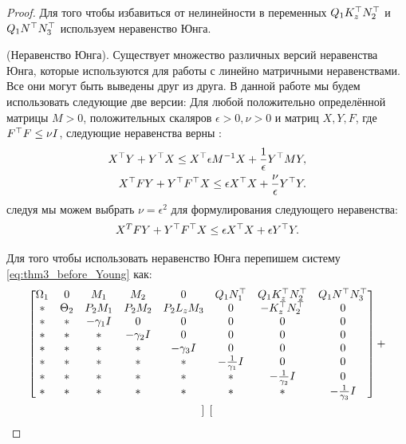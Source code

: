 \begin{proof}
Для того чтобы избавиться от нелинейности в переменных ${Q}_1{K}_z^\top{N}_2^\top$  и ${Q}_1 {N}^\top{N}_3^\top $ используем неравенство Юнга.

	\begin{lemma}\label{lemma:Young}
		(Неравенство Юнга).
		Существует множество различных версий неравенства Юнга, которые используются для работы с линейно матричными неравенствами. Все они могут быть выведены друг из друга. В данной работе мы будем использовать следующие две версии:
		Для любой положительно определённой матрицы $M>0$, положительных скаляров $\epsilon > 0, \nu > 0$ и матриц ${X}, {Y}, {F}$, где ${F}^\top{F}\leq \nu{I}$, следующие неравенства верны \cite{BOYED1994}:
		\begin{align}
			\label{eq:Young_relation_BMI}
			{X}^\top{Y} + {Y}^\top{X}  \leq {X}^\top 
			\epsilon {M}^{-1}{X} + \frac{1}{\epsilon}   {Y}^\top  {M}{Y}, 
			\\
			\label{eq:Young_robust_2}
			{X}^\top{F}{Y} + {Y}^\top{F}^\top{X}  \leq \epsilon {X}^\top{X} +  \frac{\nu}{\epsilon} {Y}^\top {Y}.
		\end{align}
		следуя \cite{LIEN2008} мы можем выбрать $\nu=\epsilon^2$ для формулирования следующего неравенства:
		\begin{equation}
			\label{eq:updated_Young_robust_2}
			{X}^T{F}{Y} + {Y}^\top{F}^\top{X}  \leq \epsilon {X}^\top{X} + \epsilon {Y}^\top{Y}.
		\end{equation}
	\end{lemma}
	Для того чтобы использовать неравенство Юнга перепишем систему \ref{eq:thm3_before_Young} как:
	\begin{multline}
	\label{eq:thm3_before_Young_2}
	\begin{bmatrix}
		{\Omega}_1 & 0 & {M}_1 & {M}_2 & 0& {Q}_1{N}_1^\top & {Q}_1{K}_z^\top{N}_2^\top & {Q}_1 {N}^\top{N}_3^\top 
		\\
		* & {\Theta}_2 & {P}_2{M}_1 & {P}_2{M}_2 & {P}_2{L}_z{M}_3 & 0 & -{K}_z^\top{N}_2^\top & 0\\
		* & * & -\gamma_1{I} & 0&0&0&0&0\\
		* & * & * & -\gamma_2{I}&0&0&0&0\\
		* & * & * & *&-\gamma_3{I}&0&0&0\\
		* & * & * & *&*&-\frac{1}{\gamma_1}{I}&0&0\\
		* & * & * & *&*&*&-\frac{1}{\gamma_2}{I}&0\\
		*&* & * & * & *&*&*&-\frac{1}{\gamma_3}{I}
	\end{bmatrix}
	+
	\\
	\begin{bmatrix}

\end{bmatrix}
\end{multline}
\end{proof}
